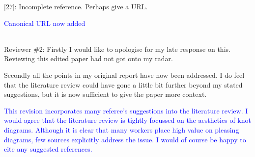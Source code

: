 \documentclass[12pt]{article}
\begin{document}
[27]:  Incomplete reference.  Perhaps give a URL.

\textcolor{blue}{Canonical URL now added\\ \\}


Reviewer \#2: Firstly I would like to apologise for my late response on
this. Reviewing this edited paper had not got onto my radar.

Secondly all the points in my original report have now been
addressed. I do feel that the literature review could have gone a
little bit further beyond my stated suggestions, but it is now
sufficient to give the paper more context.

\textcolor{blue}{This revision incorporates many referee's suggestions
  into the literature review.  I would agree that the literature
  review is tightly focussed on the aesthetics of knot diagrams.
  Although it is clear that many workers place high value on pleasing
  diagrams, few sources explicitly address the issue.  I would of
  course be happy to cite any suggested references.}
\end{document}
